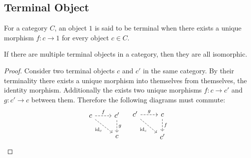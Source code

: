 \subsection{Terminal Object}

\begin{definition}
  For a category $C$, an object $1$ is said to be terminal when there exists a
  unique morphism $f: c\to 1$ for every object $c\in C$.
  \parencite{awodey:category_theory}
\end{definition}

\begin{theorem}\label{thm:terminal_object_iso}
  If there are multiple terminal objects in a category, then they are all
  isomorphic.

  \begin{proof}
    Consider two terminal objects $c$ and $c'$ in the same category. By their
    terminality there exists a unique morphism into themselves from themselves,
    the identity morphism. Additionally the exists two unique morphisms $f:c\to
    c'$ and $g:c' \to c$ between them. Therefore the following diagrams must
    commute:
    \[\begin{tikzcd}
      c & {c'} \\
      & c
      \arrow["{\id_c}"', dashed, from=1-1, to=2-2]
      \arrow["f", dashed, from=1-1, to=1-2]
      \arrow["g", dashed, from=1-2, to=2-2]
    \end{tikzcd}
    \quad
    \begin{tikzcd}
      {c'} & c \\
      & {c'}
      \arrow["{\id_c}"', dashed, from=1-1, to=2-2]
      \arrow["g", dashed, from=1-1, to=1-2]
      \arrow["f", dashed, from=1-2, to=2-2]
    \end{tikzcd}\]
  \end{proof}
\end{theorem}
